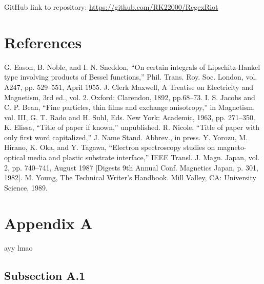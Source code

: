 \documentclass[conference]{IEEEtran}
\begin{document}
GitHub link to repository: \url{https://github.com/RK22000/RegexRiot}

\section*{References}

\begin{thebibliography}{00}
     G. Eason, B. Noble, and I. N. Sneddon, ``On certain integrals of Lipschitz-Hankel type involving products of Bessel functions,'' Phil. Trans. Roy. Soc. London, vol. A247, pp. 529--551, April 1955.
     J. Clerk Maxwell, A Treatise on Electricity and Magnetism, 3rd ed., vol. 2. Oxford: Clarendon, 1892, pp.68--73.
     I. S. Jacobs and C. P. Bean, ``Fine particles, thin films and exchange anisotropy,'' in Magnetism, vol. III, G. T. Rado and H. Suhl, Eds. New York: Academic, 1963, pp. 271--350.
     K. Elissa, ``Title of paper if known,'' unpublished.
     R. Nicole, ``Title of paper with only first word capitalized,'' J. Name Stand. Abbrev., in press.
     Y. Yorozu, M. Hirano, K. Oka, and Y. Tagawa, ``Electron spectroscopy studies on magneto-optical media and plastic substrate interface,'' IEEE Transl. J. Magn. Japan, vol. 2, pp. 740--741, August 1987 [Digests 9th Annual Conf. Magnetics Japan, p. 301, 1982].
     M. Young, The Technical Writer's Handbook. Mill Valley, CA: University Science, 1989.
\end{thebibliography}

\onecolumn
\appendices
\section{Appendix A}
ayy lmao
\subsection{Subsection A.1}
\end{document}
